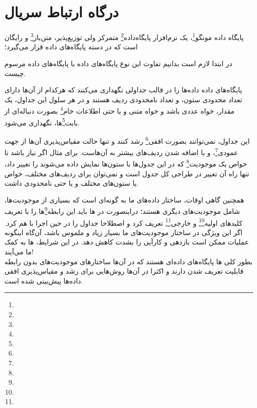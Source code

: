 \section{درگاه ارتباط سریال}

پایگاه داده مونگو\footnote{}، یک نرم‌افزار پایگاه‌داده\footnote{} متمرکز ولی توزیع‌پذیر، متن‌باز\footnote{} و رایگان است که در دسته پایگاه‌های داده  قرار می‌گیرد\cite{wiki:mongo}؛

در ابتدا لازم است بدانیم تفاوت این نوع پایگاه‌های داده با پایگاه‌های داده مرسوم  چیست.


پایگاه‌های داده  داده‌ها را در قالب جداولی نگهداری می‌کنند که هرکدام از آن‌ها دارای تعداد محدودی ستون، و تعداد نامحدودی ردیف هستند و در هر سلول این جداول، یک مقدار، خواه عددی باشد و خواه متنی و یا حتی اطلاعات خام\footnote{} بصورت دنباله‌ای از بایت\footnote{}‌ها، نگهداری می‌شود.

این جداول، نمی‌توانند بصورت افقی\footnote{} رشد کنند و تنها حالت مقیاس‌پذیری آن‌ها از جهت عمودی\footnote{}، و با اضافه شدن ردیف‌های بیشتر به آن‌هاست. برای مثال اگر نیاز باشد تا خواص یک موجودیت\footnote{} که در این جدول‌ها با ستون‌ها نمایش داده می‌شوند را تغییر داد، تنها راه آن تغییر در طراحی کل جدول است و نمی‌توان برای ردیف‌های مختلف، خواص یا ستون‌های مختلف و یا حتی نامحدودی داشت.

همچنین گاهی اوقات، ساختار داده‌های ما به گونه‌ای است که بسیاری از موجودیت‌ها، شامل موجودیت‌های دیگری هستند؛ دراینصورت در ها باید این رابطه\footnote{}‌ها را با تعریف کلید‌های اولیه\footnote{} و خارجی\footnote{} تعریف کرد و اصطلاحا جداول را در حین اجرا با هم  کرد. اگر این ویژگی در ساختار موجودیت‌های ما بسیار زیاد و ملموس باشد، آن‌گاه اینگونه عملیات ممکن است بازدهی و کارآیی را بشدت کاهش دهد. در این شرایط، ها به کمک ما می‌آیند!\\


بطور کلی ها پایگاه‌های داده‌ای هستند که در آن‌ها ساختارهای موجودیت‌های بدون رابطه قابلیت تعریف شدن دارند و اکثرا در آن‌ها روش‌هایی برای رشد و مقیاس‌پذیری افقی داده‌ها پیش‌بینی شده است.

